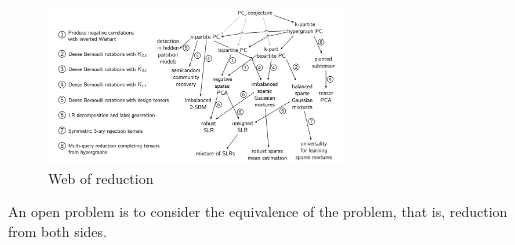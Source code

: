 \begin{figure}
    \centering
    \includegraphics[width=0.7\textwidth]{web_of_redu2.jpg}
    \caption{Web of reduction  \cite{brennan2020reducibility}}
    \label{web_of_redu2}
\end{figure}


An open problem is to consider the equivalence of the problem, that is, reduction from both sides.

